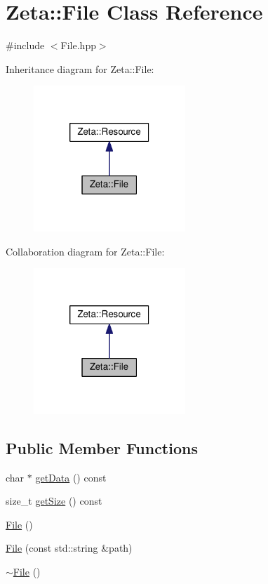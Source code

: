 \hypertarget{classZeta_1_1File}{\section{Zeta\+:\+:File Class Reference}
\label{classZeta_1_1File}
}


{\ttfamily \#include $<$File.\+hpp$>$}



Inheritance diagram for Zeta\+:\+:File\+:\nopagebreak
\begin{figure}[H]
\begin{center}
\leavevmode
\includegraphics[width=162pt]{classZeta_1_1File__inherit__graph}
\end{center}
\end{figure}


Collaboration diagram for Zeta\+:\+:File\+:\nopagebreak
\begin{figure}[H]
\begin{center}
\leavevmode
\includegraphics[width=162pt]{classZeta_1_1File__coll__graph}
\end{center}
\end{figure}
\subsection*{Public Member Functions}
\begin{DoxyCompactItemize}
\item 
char $\ast$ \hyperlink{classZeta_1_1File_aa8de0ecc1b2774ccdbbd7bf5b58d68b1}{get\+Data} () const 
\item 
size\+\_\+t \hyperlink{classZeta_1_1File_a7d8a666b770612808c011a4973e76f69}{get\+Size} () const 
\item 
\hyperlink{classZeta_1_1File_a3bf5c32b64ef1cf1faf8f16e8b92a5d6}{File} ()
\item 
\hyperlink{classZeta_1_1File_a2c8d93b819603f1ee2685275319bdd8a}{File} (const std\+::string \&path)
\item 
\hyperlink{classZeta_1_1File_ad606293e884ff632b6c42cc3114bddac}{$\sim$\+File} ()
\end{DoxyCompactItemize}
